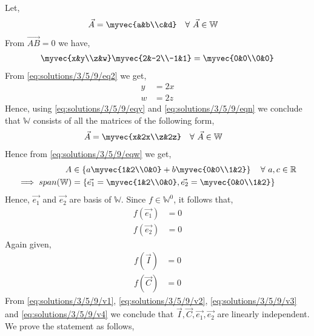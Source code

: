Let,
\begin{align}
\vec{A} &= \myvec{a&b\\c&d} \quad{\text{$\forall$ $\vec{A} \in \mathbb{W}$}}
\end{align}
From $\vec{AB} = 0$ we have,
\begin{align}
\myvec{x&y\\z&w}\myvec{2&-2\\-1&1} = \myvec{0&0\\0&0}\label{eq:solutions/3/5/9/eq2}
\end{align}
From \eqref{eq:solutions/3/5/9/eq2} we get,
\begin{align}
y &= 2x\label{eq:solutions/3/5/9/eqy}\\
w &= 2z\label{eq:solutions/3/5/9/eqn}
\end{align}
Hence, using \eqref{eq:solutions/3/5/9/eqy} and \eqref{eq:solutions/3/5/9/eqn} we conclude that $\mathbb{W}$ consists of all the matrices of the following form,
\begin{align}
\vec{A} &= \myvec{x&2x\\z&2z} \quad{\text{$\forall$ $\vec{A} \in \mathbb{W}$}}\label{eq:solutions/3/5/9/eqw}
\end{align}
Hence from \eqref{eq:solutions/3/5/9/eqw} we get,
\begin{align}
A &\in \left\{a\myvec{1&2\\0&0}+b\myvec{0&0\\1&2}\right\} \quad{\text{$\forall$ $a,c \in \mathbb{R}$}}\\
\implies span(\mathbb{W}) &= \left\{\vec{e_1} = \myvec{1&2\\0&0}, \vec{e_2} = \myvec{0&0\\1&2}\right\}
\end{align}
Hence, $\vec{e_1}$ and $\vec{e_2}$ are basis of $\mathbb{W}$.
Since $f \in \mathbb{W}^0$, it follows that,
\begin{align}
f(\vec{e_1}) &= 0\label{eq:solutions/3/5/9/v1}\\
f(\vec{e_2}) &= 0\label{eq:solutions/3/5/9/v2}
\end{align}
Again given,
\begin{align}
f(\vec{I}) &= 0\label{eq:solutions/3/5/9/v3}\\
f(\vec{C}) &= 0\label{eq:solutions/3/5/9/v4}
\end{align}
From \eqref{eq:solutions/3/5/9/v1}, \eqref{eq:solutions/3/5/9/v2}, \eqref{eq:solutions/3/5/9/v3} and \eqref{eq:solutions/3/5/9/v4} we conclude that $\vec{I},\vec{C},\vec{e_1}, \vec{e_2}$ are linearly independent. We prove the statement as follows,
